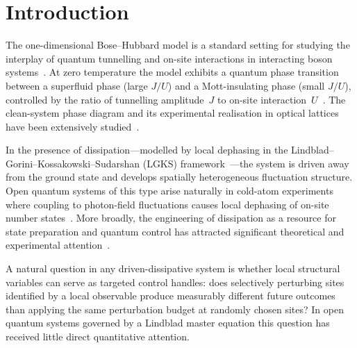 \documentclass[aps,prresearch,reprint,amsmath,amssymb,longbibliography,floatfix]{revtex4-2}
\begin{document}
\maketitle

\section{Introduction}
\label{sec:intro}

The one-dimensional Bose--Hubbard model is a standard setting for studying
the interplay of quantum tunnelling and on-site interactions in interacting
boson systems~\cite{fisher1989,jaksch1998}.
At zero temperature the model exhibits a quantum phase transition between a
superfluid phase (large $J/U$) and a Mott-insulating phase (small $J/U$),
controlled by the ratio of tunnelling amplitude~$J$ to on-site
interaction~$U$~\cite{kuhner2000,greiner2002}.
The clean-system phase diagram and its experimental realisation in
optical lattices~\cite{jaksch2005} have been extensively
studied~\cite{greiner2002}.

In the presence of dissipation---modelled by local dephasing in the
Lindblad--Gorini--Kossakowski--Sudarshan (LGKS)
framework~\cite{lindblad1976,gorini1976,breuer2002}---the system is
driven away from the ground state and develops spatially heterogeneous
fluctuation structure.
Open quantum systems of this type arise naturally in cold-atom experiments
where coupling to photon-field fluctuations causes local dephasing of
on-site number states~\cite{pichler2010,poletti2012}.
More broadly, the engineering of dissipation as a resource for state
preparation and quantum control has attracted significant theoretical and
experimental attention~\cite{diehl2008,verstraete2009,sieberer2016,daley2014}.

A natural question in any driven-dissipative system is whether local
structural variables can serve as targeted control handles: does
selectively perturbing sites identified by a local observable produce
measurably different future outcomes than applying the same perturbation
budget at randomly chosen sites?
In open quantum systems governed by a Lindblad master equation this
question has received little direct quantitative attention.
\end{document}
